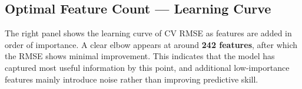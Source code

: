 \subsection{Optimal Feature Count --- Learning Curve}

The right panel shows the learning curve of CV RMSE as features are added in order of importance. A clear elbow appears at around \textbf{242 features}, after which the RMSE shows minimal improvement. This indicates that the model has captured most useful information by this point, and additional low-importance features mainly introduce noise rather than improving predictive skill.